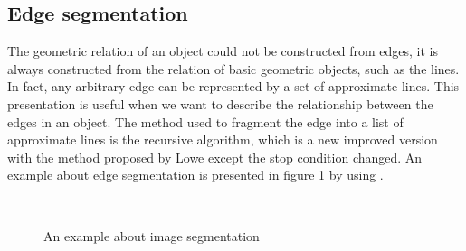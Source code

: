 \subsection{Edge segmentation}
The geometric relation of an object could not be constructed from edges, it is always constructed from the relation of basic geometric objects, such as the lines.  In fact, any arbitrary edge can be represented by a set of approximate lines. This presentation is useful when we want to describe the relationship between the edges in an object. The method used to fragment the edge into a list of approximate lines is the recursive algorithm\cite{thacker1995assessing}, which is a new improved version with the method proposed by Lowe\cite{lowe1987three} except the stop condition changed. An example about edge segmentation is presented in figure \ref{fig:figure_22} by using \cite{thacker1995assessing}.
\begin{figure}[h!]
\centering
{}~~
\caption{An example about image segmentation}
\label{fig:figure_22}
\end{figure}
